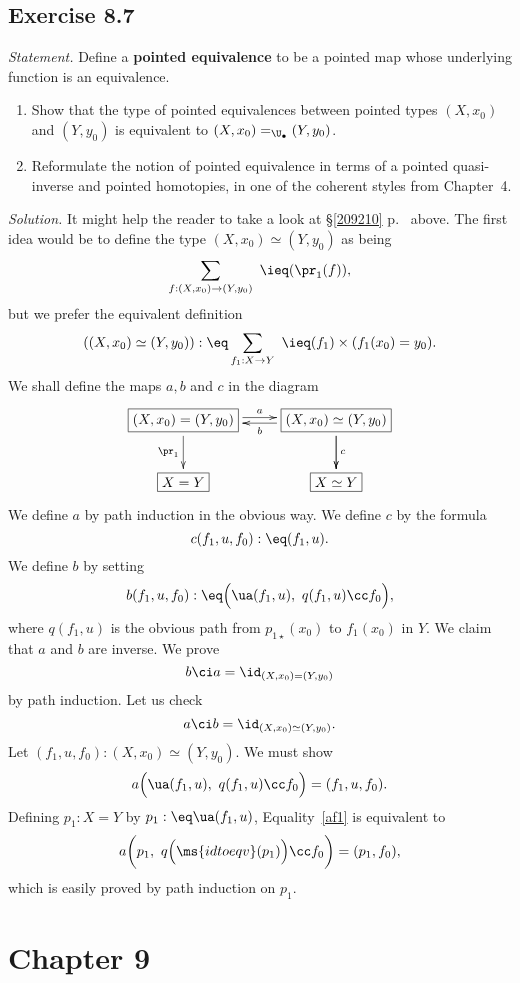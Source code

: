 \documentclass[12pt]{article}
\begin{document}

\subsection{Exercise 8.7}

\emph{Statement.} Define a \textbf{pointed equivalence} to be a pointed map whose underlying function is an equivalence.
\begin{enumerate}
\item Show that the type of pointed equivalences between pointed types $(X,x_0)$ and $(Y,y_0)$ is equivalent to $(X,x_0)=_{\U_\bullet}(Y,y_0)$.
\item Reformulate the notion of pointed equivalence in terms of a pointed quasi-inverse and pointed homotopies, in one of the coherent styles from Chapter~4.
\end{enumerate}
\emph{Solution.} It might help the reader to take a look at \S\ref{209210} p.~\pageref{209210} above. The first idea would be to define the type $(X,x_0)\simeq(Y,y_0)$ as being
$$
\sum_{f:(X,x_0)\to(Y,y_0)}\ \ieq(\pr_1(f)),
$$ 
but we prefer the equivalent definition
$$
((X,x_0)\simeq(Y,y_0)):\eq\sum_{f_1:X\to Y}\ \ieq(f_1)\times(f_1(x_0)=y_0).
$$ 
We shall define the maps $a,b$ and $c$ in the diagram 
$$
\xymatrix{
\boxed{(X,x_0)=(Y,y_0)}\ar[d]_{\pr_1}\ar@<2pt>[r]^a&\boxed{(X,x_0)\simeq(Y,y_0)}\ar@<2pt>[l]^b\ar[d]\ar[d]^c\\ 
\boxed{X=Y}&\boxed{X\simeq Y}}
$$ 
We define $a$ by path induction in the obvious way. We define $c$ by the formula 
$$
c(f_1,u,f_0):\eq(f_1,u).
$$ 
We define $b$ by setting 
$$
b(f_1,u,f_0):\eq\Big(\ua(f_1,u),\ q(f_1,u)\cc f_0\Big),
$$ 
where $q(f_1,u)$ is the obvious path from $p_{1\star}(x_0)$ to $f_1(x_0)$ in $Y$. We claim that $a$ and $b$ are inverse. We prove 
$$
b\ci a=\id_{(X,x_0)=(Y,y_0)}
$$ 
by path induction. Let us check 
$$
a\ci b=\id_{(X,x_0)\simeq(Y,y_0)}.
$$ 
Let $(f_1,u,f_0):(X,x_0)\simeq(Y,y_0)$. We must show 
\begin{equation}\label{af1}
a\Big(\ua(f_1,u),\ q(f_1,u)\cc f_0\Big)=(f_1,u,f_0).
\end{equation} 
Defining $p_1:X=Y$ by $p_1:\eq\ua(f_1,u)$, Equality~\eqref{af1} is equivalent to 
$$
a\bigg(p_1,\ q\Big(\ms{idtoeqv}(p_1)\Big)\cc f_0\bigg)=(p_1,f_0),
$$ 
which is easily proved by path induction on $p_1$.


\section{Chapter 9}
\end{document}
